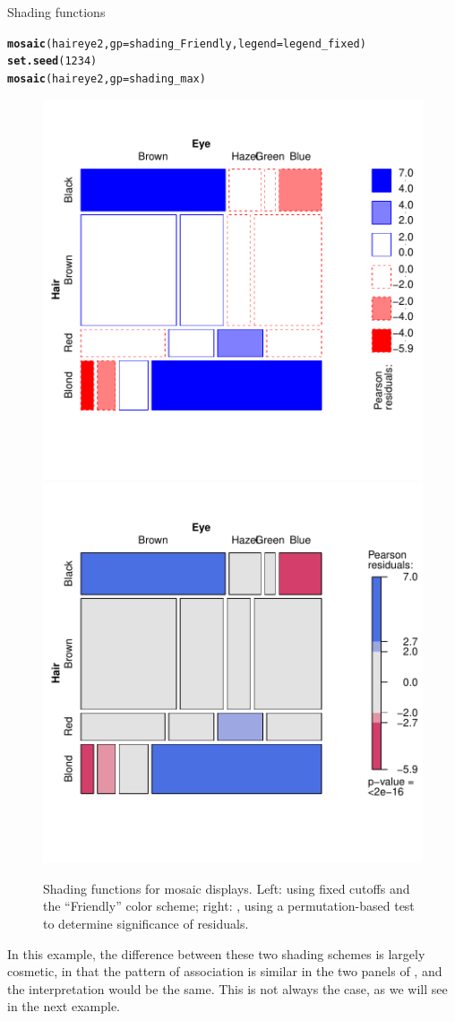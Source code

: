 \documentclass[11pt]{book}\usepackage[]{graphicx}\usepackage[]{color}
\makeatletter
\newcommand{\hlnum}[1]{\textcolor[rgb]{0.686,0.059,0.569}{#1}}%
\newcommand{\hlstd}[1]{\textcolor[rgb]{0.345,0.345,0.345}{#1}}%
\newcommand{\hlkwc}[1]{\textcolor[rgb]{0.333,0.667,0.333}{#1}}%
\newcommand{\hlkwd}[1]{\textcolor[rgb]{0.737,0.353,0.396}{\textbf{#1}}}%
\newenvironment{kframe}{%
 \def\at@end@of@kframe{}%
 \ifinner\ifhmode%
  \def\at@end@of@kframe{\end{minipage}}%
  \begin{minipage}{\columnwidth}%
 \fi\fi%
 \def\FrameCommand##1{\hskip\@totalleftmargin \hskip-\fboxsep
 \colorbox{shadecolor}{##1}\hskip-\fboxsep
     \hskip-\linewidth \hskip-\@totalleftmargin \hskip\columnwidth}%
 \MakeFramed {\advance\hsize-\width
   \@totalleftmargin\z@ \linewidth\hsize
   \@setminipage}}%
 {\par\unskip\endMakeFramed%
 \at@end@of@kframe}
\newenvironment{knitrout}{}{} %
\renewenvironment{knitrout}{\small\renewcommand{\baselinestretch}{.85}}{} %
\makeatother
\begin{document}
\begin{Example}[shading]{Shading functions}
\begin{knitrout}
\color{fgcolor}\begin{kframe}
\begin{alltt}
\hlkwd{mosaic}\hlstd{(haireye2,} \hlkwc{gp}\hlstd{=shading_Friendly,} \hlkwc{legend}\hlstd{=legend_fixed)}
\hlkwd{set.seed}\hlstd{(}\hlnum{1234}\hlstd{)}
\hlkwd{mosaic}\hlstd{(haireye2,} \hlkwc{gp}\hlstd{=shading_max)}
\end{alltt}
\end{kframe}\begin{figure}[htbp]


\centerline{\includegraphics[width=.49\textwidth]{ch05/fig/HE-shading1} 
\includegraphics[width=.49\textwidth]{ch05/fig/HE-shading2} }

\caption[Shading functions for mosaic displays]{Shading functions for mosaic displays. Left:  using fixed cutoffs and the ``Friendly'' color scheme; right: , using a permutation-based test to determine significance of residuals.\label{fig:HE-shading}}
\end{figure}


\end{knitrout}

In this example, the difference between these two shading schemes is largely cosmetic, in that
the pattern of association is similar in the two panels of , and the
interpretation would be the same.  This is not always the case, as we will see in the
next example.
\end{Example}
\end{document}

